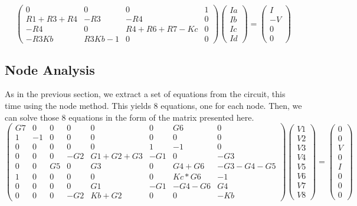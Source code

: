 \begin{equation}
\begin{pmatrix}
0 & 0 & 0 & 1 \\
R1+R3+R4 & -R3 & -R4 & 0 \\
-R4 & 0 & R4+R6+R7-Kc & 0 \\
-R3Kb & R3Kb-1 & 0 & 0
\end{pmatrix}
\begin{pmatrix}
Ia\\
Ib\\
Ic\\
Id
\end{pmatrix}
=
\begin{pmatrix}
I\\
-V\\
0\\
0
\end{pmatrix}
\end{equation}


\subsection{Node Analysis}

As in the previous section, we extract a set of equations from the circuit, this time using the node method. This yields 8 equations, one for each node. Then, we can solve those 8 equations in the form of the matrix presented here.
\begin{equation}
\begin{pmatrix}
G7 & 0 & 0 & 0 & 0 & 0 & G6 & 0\\
1 & -1 & 0 & 0 & 0 & 0 & 0 & 0\\
0 & 0 & 0 & 0 & 0 & 1 & -1 & 0\\
0 & 0 & 0 & -G2 & G1+G2+G3 & -G1 & 0 & -G3\\
0 & 0 & G5 & 0 & G3 & 0 & G4+G6 & -G3-G4-G5\\
1 & 0 & 0 & 0 & 0 & 0& Kc*G6 & -1\\
0 & 0 & 0 & 0 & G1 & -G1 & -G4-G6 & G4\\
0 & 0 & 0 & -G2 & Kb+G2 & 0 & 0 & -Kb
\end{pmatrix}
\begin{pmatrix}
V1\\
V2\\
V3\\
V4\\
V5\\
V6\\
V7\\
V8
\end{pmatrix}
=
\begin{pmatrix}
0\\
0\\
V\\
0\\
I\\
0\\
0\\
0
\end{pmatrix}
\end{equation}

